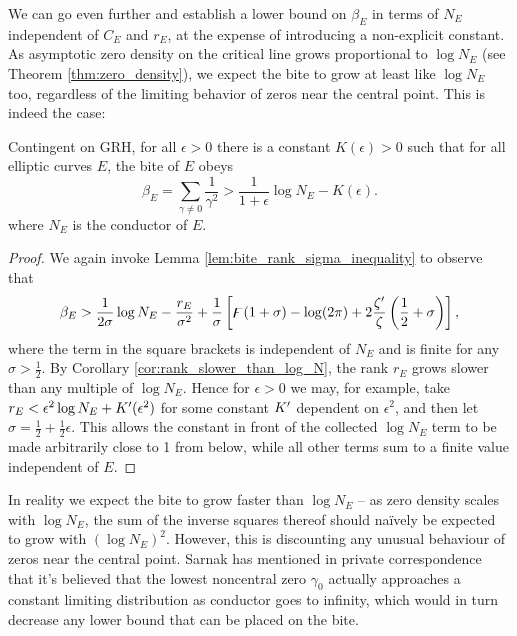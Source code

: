 We can go even further and establish a lower bound on $\beta_E$ in terms of $N_E$ independent of $C_E$ and $r_E$, at the expense of introducing a non-explicit constant. As asymptotic zero density on the critical line grows proportional to $\log N_E$ (see Theorem \ref{thm:zero_density}), we expect the bite to grow at least like $\log N_E$ too, regardless of the limiting behavior of zeros near the central point. This is indeed the case:
\begin{proposition}
Contingent on GRH, for all $\epsilon>0$ there is a constant $K(\epsilon)>0$ such that for all elliptic curves $E$, the bite of $E$ obeys
\begin{equation}\label{eqn:bite_lower_bound}
\beta_E = \sum_{\gamma\ne 0} \frac{1}{\gamma^2} > \frac{1}{1+\epsilon} \log N_E - K(\epsilon).
\end{equation}
where $N_E$ is the conductor of $E$.
\end{proposition}
\begin{proof}
We again invoke Lemma \ref{lem:bite_rank_sigma_inequality} to observe that
\begin{equation}
\beta_E > \frac{1}{2\sigma} \log N_E - \frac{r_E}{\sigma^2} + \frac{1}{\sigma}\left[\digamma(1+\sigma)-\log(2\pi) + 2\frac{\zeta^{\prime}}{\zeta}\left(\frac{1}{2}+\sigma\right)\right],
\end{equation}
where the term in the square brackets is independent of $N_E$ and is finite for any $\sigma>\frac{1}{2}$. By Corollary \ref{cor:rank_slower_than_log_N}, the rank $r_E$ grows slower than any multiple  of $\log N_E$. Hence for $\epsilon > 0$ we may, for example, take $r_E < \epsilon^2 \log N_E + K^{\prime}(\epsilon^2)$ for some constant $K^{\prime}$ dependent on $\epsilon^2$, and then let $\sigma = \frac{1}{2}+\frac{1}{2}\epsilon$. This allows the constant in front of the collected $\log N_E$ term to be made arbitrarily close to 1 from below, while all other terms sum to a finite value independent of $E$.
\end{proof}

In reality we expect the bite to grow faster than $\log N_E$ -- as zero density scales with $\log N_E$, the sum of the inverse squares thereof should na\"{i}vely be expected to grow with $(\log N_E)^2$. However, this is discounting any unusual behaviour of zeros near the central point. Sarnak has mentioned in private correspondence that it's believed that the lowest noncentral zero $\gamma_0$ actually approaches a constant limiting distribution as conductor goes to infinity, which would in turn decrease any lower bound that can be placed on the bite. \\

